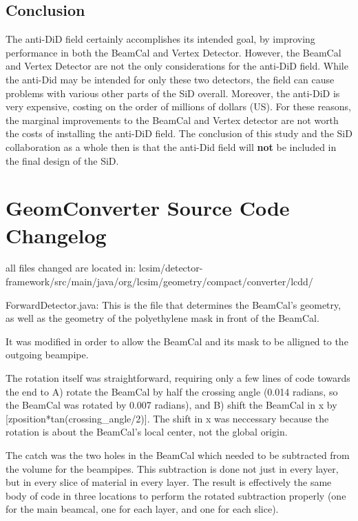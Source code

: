 \documentclass{report}
\begin{document}
            \subsection{Conclusion}
                The anti-DiD field certainly accomplishes its intended goal, by improving performance in both the BeamCal and Vertex Detector. However, the BeamCal and Vertex Detector are not the only considerations for the anti-DiD field. While the anti-Did may be intended for only these two detectors, the field can cause problems with various other parts of the SiD overall. Moreover, the anti-DiD is very expensive, costing on the order of millions of dollars (US). For these reasons, the marginal improvements to the BeamCal and Vertex detector are not worth the costs of installing the anti-DiD field. The conclusion of this study and the SiD collaboration as a whole then is that the anti-Did field will \textbf{not} be included in the final design of the SiD.





    \appendix
    \section{GeomConverter Source Code Changelog} \label{geom_changes}
        all files changed are located in:
        lcsim/detector-framework/src/main/java/org/lcsim/geometry/compact/converter/lcdd/


        ForwardDetector.java:
            This is the file that determines the BeamCal's geometry, as well as the
            geometry of the polyethylene mask in front of the BeamCal.
            
            It was modified in order to allow the BeamCal and its mask to be alligned
            to the outgoing beampipe.
            
            The rotation itself was straightforward, requiring only a few lines of
            code towards the end to A) rotate the BeamCal by half the crossing angle
            (0.014 radians, so the BeamCal was rotated by 0.007 radians), and B) 
            shift the BeamCal in x by [zposition*tan(crossing_angle/2)]. The
            shift in x was neccessary because the rotation is about the BeamCal's
            local center, not the global origin. 

            The catch was the two holes in the BeamCal which needed to be subtracted
            from the volume for the beampipes. This subtraction is done not just in
            every layer, but in every slice of material in every layer. The result is
            effectively the same body of code in three locations to perform the
            rotated subtraction properly (one for the main beamcal, one for each
            layer, and one for each slice). 
\end{document}
